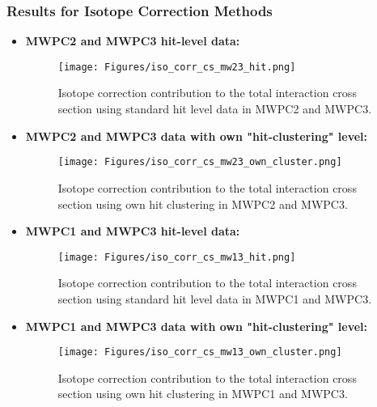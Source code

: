 \subsubsection{Results for Isotope Correction Methods}
\begin{itemize}
\item \textbf{MWPC2 and MWPC3 hit-level data:}\newline
\begin{figure}[h!]
    \centering
    \texttt{[image: Figures/iso\_corr\_cs\_mw23\_hit.png]}
    \caption{
	Isotope correction contribution to the total interaction cross section using standard hit level data in MWPC2 and MWPC3.
     }
    \label{fig:iso_corr_mw23_default}
\end{figure}

\item \textbf{MWPC2 and MWPC3 data with own "hit-clustering" level:}\newline 
\begin{figure}[h!]
    \centering
    \texttt{[image: Figures/iso\_corr\_cs\_mw23\_own\_cluster.png]}
    \caption{
	Isotope correction contribution to the total interaction cross section using own  hit clustering in MWPC2 and MWPC3.
     }
    \label{fig:iso_corr_mw23_own_cluster}
\end{figure}

\item \textbf{MWPC1 and MWPC3 hit-level data:}\newline
\begin{figure}[h!]
    \centering
    \texttt{[image: Figures/iso\_corr\_cs\_mw13\_hit.png]}
    \caption{
	Isotope correction contribution to the total interaction cross section using standard hit level data  in MWPC1 and MWPC3.
     }
    \label{fig:iso_corr_mw13_default}
\end{figure}

\item \textbf{MWPC1 and MWPC3 data with own "hit-clustering" level:}\newline
\begin{figure}[h!]
    \centering
    \texttt{[image: Figures/iso\_corr\_cs\_mw13\_own\_cluster.png]}
    \caption{
	Isotope correction contribution to the total interaction cross section using own  hit clustering in MWPC1 and MWPC3.
     }
    \label{fig:iso_corr_mw13_own_cluster}
\end{figure}


\end{itemize}
